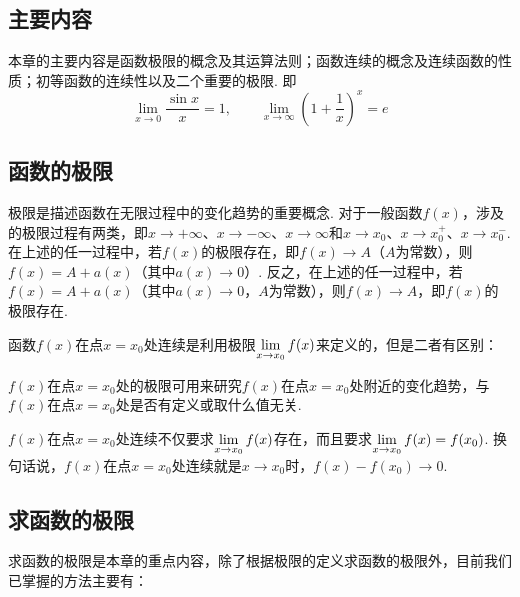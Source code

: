 \subsection*{主要内容}
本章的主要内容是函数极限的概念及其运算法则；函数连续的概念及连续函数的性质；初等函数的连续性以及二个重要的极限. 即
\[\lim_{x\to 0}\frac{\sin x}{x}=1,\qquad \lim_{x\to \infty}\left(1+\frac{1}{x}\right)^x=e\]


\subsection*{函数的极限}
极限是描述函数在无限过程中的变化趋势的重要概念. 对于一般函数$f(x)$，涉及的极限过程有两类，即$x\to +\infty$、$x\to-\infty$、$x\to \infty$和$x\to x_0$、$x\to x_0^+$、$x\to x_0^-$. 在上述的任一过程中，若$f(x)$的极限存在，即$f(x)\to A$（$A$为常数），则$f(x)=A+a(x)$（其中$a(x)\to 0$）. 反之，在上述的任一过程中，若$f(x)
=A+a(x)$（其中$a(x)\to 0$，$A$为常数），则$f(x)\to A$，即$f(x)$的极限存在.

函数$f(x)$在点$x=x_0$处连续是利用极限$\lim\limits_{x\to x_0}f(x)$来定义的，但是二者有区别：

$f(x)$在点$x=x_0$处的极限可用来研究$f(x)$在点$x=x_0$处附近的变化趋势，与$f(x)$在点$x=x_0$处是否有定义或取什么值无关.

$f(x)$在点$x=x_0$处连续不仅要求$\lim\limits_{x\to x_0}f(x)$存在，而且要求$\lim\limits_{x\to x_0}f(x)=f(x_0)$. 换句话说，$f(x)$在点$x=x_0$处连续就是$x\to x_0$时，$f(x)-f(x_0)\to 0$.

\subsection*{求函数的极限}
求函数的极限是本章的重点内容，除了根据极限的定义求函数的极限外，目前我们已掌握的方法主要有：

